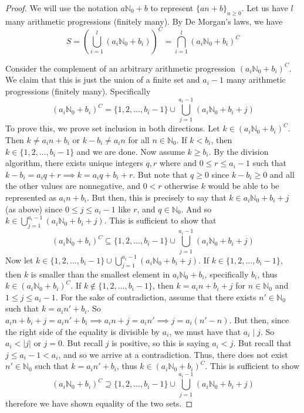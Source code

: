 \documentclass{article}
\newcommand{\N}{{\mathbb N}}
\begin{document}
\begin{proof}
	We will use the notation $a\N_0 + b$ to represent $\{an+b\}_{n\geq 0}$.
	Let us have $l$ many arithmetic progressions (finitely many).
	By De Morgan's laws, we have
	\[
		S = \left(\bigcup_{i=1}^l(a_i\N_0 + b_i)\right)^C =
		\bigcap_{i=1}^l\left(a_i\N_0 + b_i\right)^C
	\]

	Consider the complement of an arbitrary arithmetic progression
	$(a_i \N_0 + b_i)^C$.
	We claim that this is just the union of a finite set
	and $a_i-1$ many arithmetic progressions (finitely many).
	Specifically
	\[
		(a_i \N_0 + b_i)^C = \{1,2,\dots,b_i-1\} \cup
		\bigcup_{j=1}^{a_i-1}(a_i\N_0 + b_i + j)
	\]
	To prove this, we prove set inclusion in both directions.
	Let $k \in (a_i\N_0 + b_i)^C$.
	Then $k \neq a_in + b_i$ or $k - b_i \neq a_in$ for all $n \in \N_0$.
	If $k < b_i$, then $k \in \{1,2,\dots,b_i-1\}$ and we are done.
	Now assume $k \geq b_i$.
	By the division algorithm, there exists unique integers $q,r$
	where and $0 \leq r \leq a_i - 1$ such that
	$k - b_i = a_iq + r \implies k = a_iq + b_i + r$.
	But note that $q \geq 0$ since $k - b_i \geq 0$ and all the other values are nonnegative,
	and $0 < r$ otherwise $k$ would be able to be represented as $a_in + b_i$.
	But then, this is precisely to say that
	$k \in a_i\N_0 + b_i + j$ (as above) since
	$0 \leq j \leq a_i-1$ like $r$, and $q \in \N_0$.
	And so $k \in \bigcup_{j=1}^{a_i - 1}(a_i\N_0 + b_i + j)$.
	This is sufficient to show that
	\[
		(a_i \N_0 + b_i)^C \subseteq \{1,2,\dots,b_i-1\} \cup
		\bigcup_{j=1}^{a_i-1}(a_i\N_0 + b_i + j)
	\]
	Now let $k \in \{1,2,\dots,b_i-1\} \cup \bigcup_{j=1}^{a_i-1}(a_i\N_0 + b_i + j)$.
	If $k \in \{1,2,\dots,b_i-1\}$,
	then $k$ is smaller than the smallest element in $a_i\N_0 + b_i$,
	specifically $b_i$,
	thus $k \in (a_i\N_0 + b_i)^C$.
	If $k \not\in\{1,2,\dots,b_i-1\}$,
	then $k = a_in + b_i + j$ for $n\in\N_0$ and $1 \leq j \leq a_i-1$.
	For the sake of contradiction, assume that there exists $n'\in\N_0$
	such that $k = a_in' + b_i$.
	So $a_in + b_i + j = a_in' + b_i \implies a_in + j = a_in' \implies j= a_i(n' - n)$.
	But then, since the right side of the equality is divisible by $a_i$,
	we must have that $a_i \mid j$.
	So $a_i < |j|$ or $j = 0$.
	But recall $j$ is positive, so this is saying
	$a_i < j$.
	But recall that $j \leq a_i - 1 < a_i$,
	and so we arrive at a contradiction.
	Thus, there does not exist $n' \in \N_0$ such that $k = a_in' + b_i$,
	thus $k \in (a_i\N_0 + b_i)^C$.
	This is sufficient to show
	\[
		(a_i \N_0 + b_i)^C \supseteq \{1,2,\dots,b_i-1\}
		\cup \bigcup_{j=1}^{a_i-1}(a_i\N_0 + b_i + j)
	\]
	therefore we have shown equality of the two sets.
	

\end{proof}
\end{document}
